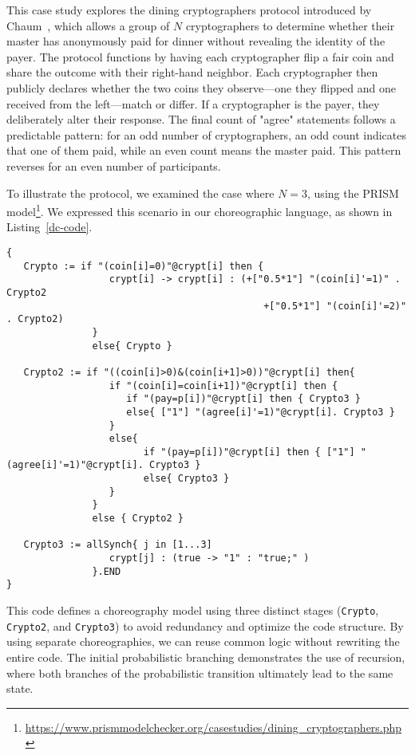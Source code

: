 This case study explores the dining cryptographers protocol introduced by Chaum~\cite{Cha88}, which allows a group of $N$ cryptographers to determine whether their master has anonymously paid for dinner without revealing the identity of the payer. The protocol functions by having each cryptographer flip a fair coin and share the outcome with their right-hand neighbor. Each cryptographer then publicly declares whether the two coins they observe—one they flipped and one received from the left—match or differ. If a cryptographer is the payer, they deliberately alter their response. The final count of "agree" statements follows a predictable pattern: for an odd number of cryptographers, an odd count indicates that one of them paid, while an even count means the master paid. This pattern reverses for an even number of participants.

To illustrate the protocol, we examined the case where $N=3$, using the PRISM model\footnote{\url{https://www.prismmodelchecker.org/casestudies/dining_cryptographers.php}}. We expressed this scenario in our choreographic language, as shown in Listing~\ref{dc-code}.
\begin{lstlisting}[style=chor-color,caption={Choreography for the Dining Cryptographers Protocol.},captionpos=b,label={dc-code}]
{
   Crypto := if "(coin[i]=0)"@crypt[i] then {
                  crypt[i] -> crypt[i] : (+["0.5*1"] "(coin[i]'=1)" . Crypto2
                                             +["0.5*1"] "(coin[i]'=2)" . Crypto2) 
               }
               else{ Crypto }

   Crypto2 := if "((coin[i]>0)&(coin[i+1]>0))"@crypt[i] then{
                  if "(coin[i]=coin[i+1])"@crypt[i] then {
                     if "(pay=p[i])"@crypt[i] then { Crypto3 }
                     else{ ["1"] "(agree[i]'=1)"@crypt[i]. Crypto3 }
                  }
                  else{
                        if "(pay=p[i])"@crypt[i] then { ["1"] "(agree[i]'=1)"@crypt[i]. Crypto3 }
                        else{ Crypto3 }
                  }
               }
               else { Crypto2 }

   Crypto3 := allSynch{ j in [1...3]
                  crypt[j] : (true -> "1" : "true;" )
               }.END
}
\end{lstlisting}
This code defines a choreography model using three distinct stages (\texttt{Crypto}, \texttt{Crypto2}, and \texttt{Crypto3}) to avoid redundancy and optimize the code structure. By using separate choreographies, we can reuse common logic without rewriting the entire code.
The initial probabilistic branching demonstrates the use of recursion, where both branches of the probabilistic transition ultimately lead to the same state. 

